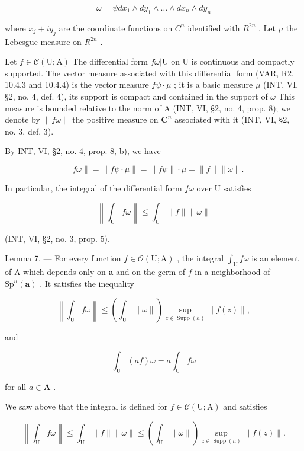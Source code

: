 \[
\omega = \psi d x _ {1} \wedge d y _ {1} \wedge \dots \wedge d x _ {n} \wedge d y _ {n}
\]

where \(x_{j} + iy_{j}\) are the coordinate functions on \(C^{n}\) identified with \(R^{2n}\) . Let \(\mu\) the Lebesgue measure on \(R^{2n}\) .

Let \(f \in \mathcal{C}(\mathrm{U};\mathrm{A})\) The differential form \(f\omega|\mathrm{U}\) on \(\mathrm{U}\) is continuous and compactly supported. The vector measure associated with this differential form (VAR, R2, 10.4.3 and 10.4.4) is the vector measure \(f\psi \cdot \mu\) ; it is a basic measure \(\mu\) (INT, VI, §2, no. 4, def. 4), its support is compact and contained in the support of \(\omega\) This measure is bounded relative to the norm of A (INT, VI, §2, no. 4, prop. 8); we denote by \(\| f\omega\|\) the positive measure on \(\mathbf{C}^n\) associated with it (INT, VI, §2, no. 3, def. 3).

By INT, VI, §2, no. 4, prop. 8, b), we have

\[
\| f \omega \| = \| f \psi \cdot \mu \| = \| f \psi \| \cdot \mu = \| f \| \| \omega \|.
\]

In particular, the integral of the differential form \(f\omega\) over U satisfies

\[
\left\| \int_ {\mathrm{U}} f \omega \right\| \leqslant \int_ {\mathrm{U}} \| f \| \| \omega \|
\]

(INT, VI, §2, no. 3, prop. 5).

Lemma 7. --- For every function \(f \in \mathcal{O}(\mathrm{U};\mathrm{A})\) , the integral \(\int_{\mathrm{U}} f\omega\) is an element of A which depends only on \(\boldsymbol{a}\) and on the germ of \(f\) in a neighborhood of \(\mathrm{Sp}^{n}(\boldsymbol{a})\) . It satisfies the inequality

\[
\left\| \int_ {\mathrm{U}} f \omega \right\| \leqslant \left(\int_ {\mathrm{U}} \| \omega \|\right) \sup _ {z \in \operatorname{Supp} (h)} \| f (z) \|,\tag{4}
\]

and

\[
\int_ {\mathrm{U}} (a f) \omega = a \int_ {\mathrm{U}} f \omega
\]

for all \(a \in \mathbf{A}\) .

We saw above that the integral is defined for \(f \in \mathcal{C}(\mathrm{U};\mathrm{A})\) and satisfies

\[
\left\| \int_ {\mathrm{U}} f \omega \right\| \leqslant \int_ {\mathrm{U}} \| f \| \| \omega \| \leqslant \left(\int_ {\mathrm{U}} \| \omega \|\right) \sup _ {z \in \operatorname{Supp} (h)} \| f (z) \|.
\]

